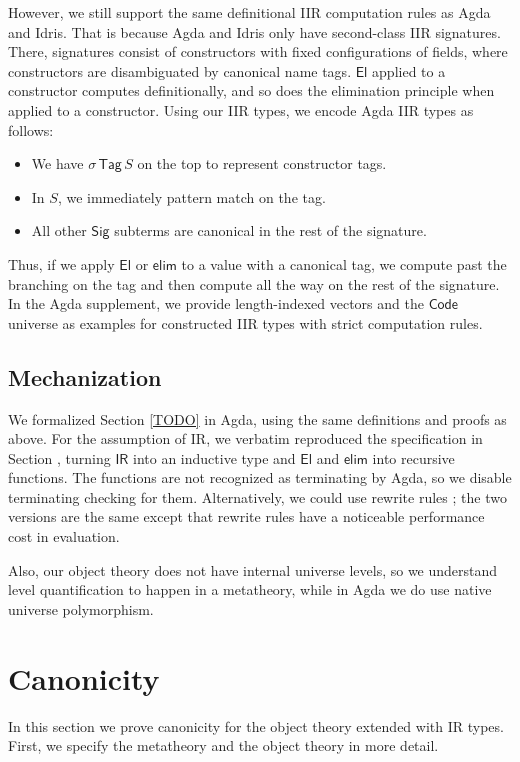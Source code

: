 \documentclass[acmsmall,screen,review,anonymous]{acmart}
\newcommand{\msf}[1]{{\mathsf{#1}}}
\newcommand{\El}{\msf{El}}
\newcommand{\Sig}{\msf{Sig}}
\newcommand{\Code}{\msf{Code}}
\newcommand{\Tag}{\msf{Tag}}
\newcommand{\IR}{\msf{IR}}
\newcommand{\elim}{\msf{elim}}
\begin{document}
However, we still support the same definitional IIR computation rules as Agda and Idris. That is
because Agda and Idris only have second-class IIR signatures. There, signatures consist of
constructors with fixed configurations of fields, where constructors are disambiguated by canonical
name tags. $\El$ applied to a constructor computes definitionally, and so does the elimination
principle when applied to a constructor. Using our IIR types, we encode Agda IIR types as follows:
\begin{itemize}
\item We have $\sigma\,\Tag\,S$ on the top to represent constructor tags.
\item In $S$, we immediately pattern match on the tag.
\item All other $\Sig$ subterms are canonical in the rest of the signature.
\end{itemize}
Thus, if we apply $\El$ or $\elim$ to a value with a canonical tag, we compute past the branching on
the tag and then compute all the way on the rest of the signature. In the Agda supplement, we provide
length-indexed vectors and the $\Code$ universe as examples for constructed IIR types with strict
computation rules.

\subsection{Mechanization}

We formalized Section \ref{TODO} in Agda, using the same definitions and proofs as above. For the
assumption of IR, we verbatim reproduced the specification in Section \cite{TODO}, turning $\IR$
into an inductive type and $\El$ and $\elim$ into recursive functions. The functions are not
recognized as terminating by Agda, so we disable terminating checking for them. Alternatively, we
could use rewrite rules \cite{TODO}; the two versions are the same except that rewrite rules have a
noticeable performance cost in evaluation.

Also, our object theory does not have internal universe levels, so we understand level
quantification to happen in a metatheory, while in Agda we do use native universe polymorphism.

\section{Canonicity}\label{sec:canonicity}

In this section we prove canonicity for the object theory extended with IR types. First, we specify
the metatheory and the object theory in more detail.
\end{document}
